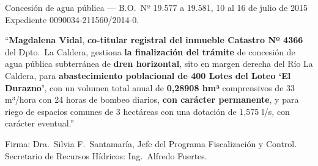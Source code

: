 \begin{ficha}{Concesión de agua pública --- B.O.\ Nº 19.577 a 19.581, 10 al 16 de julio de 2015}
Expediente 0090034-211560/2014-0.

``\textbf{Magdalena Vidal}, \textbf{co-titular registral del inmueble Catastro Nº 4366} del Dpto.\ La Caldera, gestiona \textbf{la finalización del trámite} de concesión de agua pública subterránea de \textbf{dren horizontal}, sito en margen derecha del Río La Caldera, para \textbf{abastecimiento poblacional de 400 Lotes del Loteo `El Durazno'}, con un volumen total anual de \textbf{0,28908 hm³} comprensivos de 33 m³/hora con 24 horas de bombeo diarios, \textbf{con carácter permanente}, y para riego de espacios comunes de 3 hectáreas con una dotación de 1,575 l/s, con carácter eventual.''

Firma: Dra.\ Silvia F.\ Santamaría, Jefe del Programa Fiscalización y Control. Secretario de Recursos Hídricos: Ing.\ Alfredo Fuertes.
\end{ficha}

